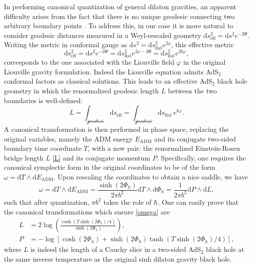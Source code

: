 \documentclass[a4paper,titlepage,12pt]{article}
\numberwithin{equation}{section}
\begin{document}
In performing canonical quantization of general dilaton gravities, an apparent difficulty arises from the fact that there is no unique geodesic connecting two arbitrary boundary points \cite{Kruthoff:2024gxc}. To address this, in our case it is more natural to consider geodesic distances measured in a Weyl-rescaled geometry $\mathrm{d}s_{\mathrm{eff}}^2=\mathrm{d}s^2 e^{-2 \Phi}$. Writing the metric in conformal gauge as $\mathrm{d}s^2 = \mathrm{d}s_{\mathrm{flat}}^2 e^{2\rho}$, this effective metric 
\begin{equation}
\mathrm{d}s_{\mathrm{eff}}^2=\mathrm{d}s^2 e^{-2 \Phi}=\mathrm{d}s_{\mathrm{flat}}^2 e^{2\rho-2 \Phi}=\mathrm{d}s_{\mathrm{flat}}^2 e^{2b \varphi},
\end{equation} 
corresponds to the one associated with the Liouville field $\varphi$ in the original Liouville gravity formulation. Indeed the Liouville equation admits AdS$_2$ conformal factors as classical solutions. This leads to an effective AdS$_2$ black hole geometry in which the renormalized geodesic length $L$ between the two boundaries is well-defined:
\begin{equation}\label{L}
L = \int_\mathcal{\text{geodesic}}\mathrm{d} s_{\text{eff}} = \int_\mathcal{\text{geodesic}} \mathrm{d} s_{\text{flat}} \,e^{b\varphi}.
\end{equation}
A canonical transformation is then performed in phase space, replacing the original variables, namely the ADM energy $E_{\mathrm{ADM}}$ and its conjugate two-sided boundary time coordinate $T$, with a new pair: the renormalized Einstein-Rosen bridge length $L$ \eqref{L} and its conjugate momentum $P$. Specifically, one requires the canonical symplectic form in the original coordinates to be of the form $\omega= \mathrm{d}T\land \mathrm{d} E_{\mathrm{ADM}}$. Upon rescaling the coordinates to obtain a nice saddle, we have
\begin{equation}\label{omega}
\omega=\mathrm{d}T \wedge \mathrm{d}E_{\mathrm{ADM}}=\frac{\sinh(2\Phi_h)}{2\pi b^2}\mathrm{d}T\wedge \mathrm{d}\Phi_h=\frac{1}{  2\pi b^2} \mathrm{d}P \wedge \mathrm{d}L,
\end{equation}
such that after quantization, $\pi b^2$ takes the role of $\hbar$.
One can easily prove that the canonical transformations which ensure \eqref{omega} are
\begin{equation}\label{rel}
\begin{split}
L&=2\log \left(\frac{\cosh \left(T \sinh (2 \Phi_h)/4\right)}{\sinh (2 \Phi_h)}\right),\\ 
P&=-\log \left[\cosh(2 \Phi_h)+\sinh (2 \Phi_h)\tanh \left(T \sinh (2 \Phi_h)/4\right)\right],
\end{split}
\end{equation}
where $L$ is indeed the length of a Cauchy slice in a two-sided AdS$_2$ black hole at the same inverse temperature as the original sinh dilaton gravity black hole.
\end{document}
